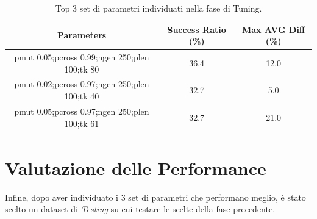 \begin{table}[H]
    \centering
    \begin{tabular}{||c||c||c||}
        \textbf{Parameters}                           & \textbf{Success Ratio (\%)} & \textbf{Max AVG Diff (\%)} \\
        \hline
        pmut 0.05;pcross 0.99;ngen 250;plen 100;tk 80 & 36.4                        & 12.0                       \\
        pmut 0.02;pcross 0.97;ngen 250;plen 100;tk 40 & 32.7                        & 5.0                        \\
        pmut 0.05;pcross 0.97;ngen 250;plen 100;tk 61 & 32.7                        & 21.0                       \\
    \end{tabular}
    \caption{Top 3 set di parametri individuati nella fase di Tuning.\label{tab:param}}
\end{table}

\section{Valutazione delle Performance}

Infine, dopo aver individuato i 3 set di parametri che performano meglio, è
stato scelto un dataset di \textit{Testing} su cui testare le scelte della fase
precedente.

